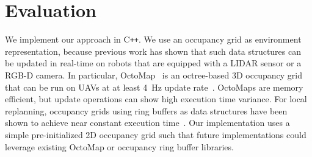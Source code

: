 \documentclass{svproc}
\newcommand{\todo}[1]{\textbf{\textcolor{red}{TODO: #1}}}
\begin{document}



\section{Evaluation}

We implement our approach in C\texttt{++}.
We use an occupancy grid as environment representation, because previous work has shown that such data structures can be updated in real-time on robots that are equipped with a LIDAR sensor or a RGB-D camera.
In particular, OctoMap~\cite{octomap} is an octree-based 3D occupancy grid that can be run on UAVs at at least \SI{4}{Hz} update rate~\cite{replanning-eth}.
OctoMaps are memory efficient, but update operations can show high execution time variance.
For local replanning, occupancy grids using ring buffers as data structures have been shown to achieve near constant execution time~\cite{replanning-usenko}.
Our implementation uses a simple pre-initialized 2D occupancy grid such that future implementations could leverage existing OctoMap or occupancy ring buffer libraries.
\end{document}
